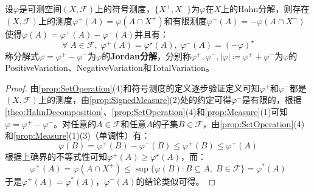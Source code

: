 \begin{theorem}
	\label{theo:JordanDecomposition}
	设$\varphi$是可测空间$(X,\mathscr{F})$上的符号测度，$\{X^+,X^-\}$为$\varphi$在$X$上的Hahn分解，则存在$(X,\mathscr{F})$上的测度$\varphi^+(A)=\varphi(A\cap X^+)$和有限测度$\varphi^-(A)=-\varphi(A\cap X^-)$使得$\varphi(A)=\varphi^+(A)-\varphi^-(A)$并且有：
	\begin{equation*}
		\forall\;A\in\mathscr{F},\;\varphi^+(A)=\varphi^{\star}(A),\;\varphi^-(A)=(-\varphi)^{\star}
	\end{equation*}
	称分解式$\varphi=\varphi^+-\varphi^-$为$\varphi$的\textbf{Jordan分解}，分别称$\varphi^+,\varphi^-,|\varphi|\coloneq\varphi^++\varphi^-$为$\varphi$的\gls{PositiveVariation}、\gls{NegativeVariation}和\gls{TotalVariation}。
\end{theorem}
\begin{proof}
	由\cref{prop:SetOperation}(4)和符号测度的定义逐步验证定义可知$\varphi^+$和$\varphi^-$都是$(X,\mathscr{F})$上的测度，由\cref{prop:SignedMeasure}(2)处的约定可得$\varphi^-$是有限的，根据\cref{theo:HahnDecomposition}、\cref{prop:SetOperation}(4)和\cref{prop:Measure}(1)可知$\varphi=\varphi^+-\varphi^-$。对任意的$A\in\mathscr{F}$和任意$A$的子集$B\in\mathscr{F}$，由\cref{prop:SetOperation}(4)和\cref{prop:Measure}(1)(3)（单调性）有：
	\begin{equation*}
		\varphi(B)=\varphi^+(B)-\varphi^-(B)\leqslant\varphi^+(B)\leqslant\varphi^+(A)
	\end{equation*}
	根据上确界的不等式性可知$\varphi^+(A)\geqslant\varphi^{\star}(A)$，而：
	\begin{equation*}
		\varphi^+(A)=\varphi(A\cap X^+)\leqslant\sup\{\varphi(B):B\subseteq A,\;B\in\mathscr{F}\}=\varphi^*(A)
	\end{equation*}
	于是$\varphi^+(A)=\varphi^*(A)$，$\varphi^-(A)$的结论类似可得。
\end{proof}

